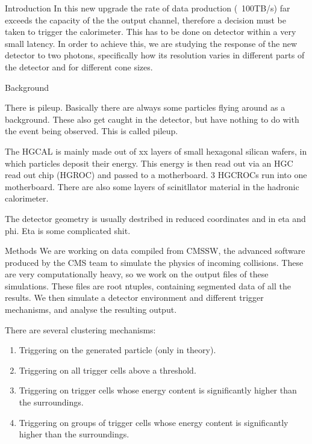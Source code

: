 \documentclass[final,hyperref={pdfpagelabels=false}]{beamer}
\begin{document}
\begin{frame}[t]
\begin{columns}[t]
\begin{column}{.465\textwidth}
\begin{block}{Introduction}
	In this new upgrade the rate of data production (~100TB/s) far exceeds the capacity of the the output channel, therefore a decision must be taken to trigger the calorimeter. This has to be done on detector within a very small latency. In order to achieve this, we are studying the response of the new detector to two photons, specifically how its resolution varies in different parts of the detector and for different cone sizes. 
\end{block}

            
\begin{block}{Background}

	There is pileup. Basically there are always some particles flying around as a background. These also get caught in the detector, but have nothing to do with the event being observed. This is called pileup.

	The HGCAL is mainly made out of xx layers of small hexagonal silican wafers, in which particles deposit their energy. This energy is then read out via an HGC read out chip (HGROC) and passed to a motherboard. 3 HGCROCs run into one motherboard. There are also some layers of scinitllator material in the hadronic calorimeter. 

	The detector geometry is usually destribed in reduced coordinates and in eta and phi. Eta is some complicated shit. 
\end{block}


\begin{block}{Methods}
	We are working on data compiled from CMSSW, the advanced software produced by the CMS team to simulate the physics of incoming collisions. These are very computationally heavy, so we work on the output files of these simulations. These files are root ntuples, containing segmented data of all the results. We then simulate a detector environment and different trigger mechanisms, and analyse the resulting output. 

	There are several clustering mechanisms:
	\begin{enumerate}
		\item Triggering on the generated particle (only in theory).
		\item Triggering on all trigger cells above a threshold.
		\item Triggering on trigger cells whose energy content is significantly higher than the surroundings.
		\item Triggering on groups of trigger cells whose energy content is significantly higher than the surroundings.
	\end{enumerate}
	

\end{block}
\end{column}
\end{columns}
\end{frame}
\end{document}
